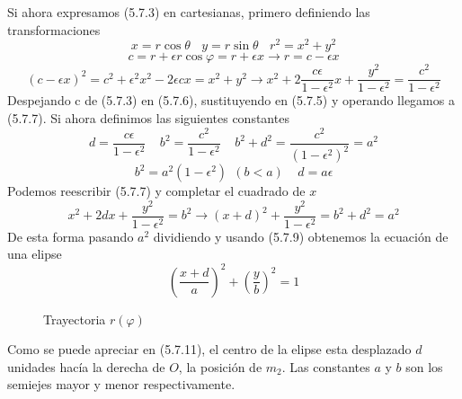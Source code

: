 Si ahora expresamos (5.7.3) en cartesianas, primero definiendo las transformaciones
\begin{equation} \label{5.1.5}
    x = r\cos\theta \ \ \ \ y = r\sin \theta \ \ \ \ r^2=x^2+y^2
\end{equation} 
\vspace{-15pt}
\begin{equation} \label{5.1.6}
    c = r +\epsilon r \cos\varphi = r+\epsilon x \rightarrow r = c-\epsilon x
\end{equation} 
\vspace{-20pt}
\begin{equation} \label{5.1.7}
    (c-\epsilon x)^2 = c^2 + \epsilon^2 x^2 -2\epsilon c x = x^2 + y^2 \rightarrow x^2 +2 \frac{c\epsilon}{1-\epsilon^2}x +\frac{y^2}{1-\epsilon^2}=\frac{c^2}{1-\epsilon^2}
\end{equation} 
Despejando c de (5.7.3) en (5.7.6), sustituyendo en (5.7.5) y operando llegamos a (5.7.7). Si ahora definimos las siguientes constantes
\begin{equation} \label{5.1.8}
    d = \frac{c\epsilon}{1-\epsilon^2} \ \ \ \ \ b^2 = \frac{c^2}{1-\epsilon^2} \ \ \ \ \ b^2 + d^2 = \frac{c^2}{(1-\epsilon^2)^2} = a^2
\end{equation} 
\vspace{-15pt}
\begin{equation} \label{5.1.8}
    b^2 = a^2(1-\epsilon^2) \ \ (b<a) \ \ \ \ \ d=a\epsilon
\end{equation} 
Podemos reescribir (5.7.7) y completar el cuadrado de $x$
\begin{equation} \label{5.1.7}
    x^2 +2dx +\frac{y^2}{1-\epsilon^2}=b^2 \rightarrow (x+d)^2 +\frac{y^2}{1-\epsilon^2}=b^2 + d^2 = a^2
\end{equation} 
De esta forma pasando $a^2$ dividiendo y usando (5.7.9) obtenemos la ecuación de una elipse
\begin{equation} \label{5.1.7}
    \left(\frac{x+d}{a}\right)^2 +\left(\frac{y}{b}\right)^2=1
\end{equation} 
\begin{figure}[H]
    \def\svgwidth{15 cm}
    \normalsize
	
    \vspace{-75pt}
    \caption{Trayectoria $r(\varphi)$}
\end{figure}
\vspace{15pt}
Como se puede apreciar en (5.7.11), el centro de la elipse esta desplazado $d$ unidades hacía la derecha de $O$, la posición de $m_2$. Las constantes $a$ y $b$ son los semiejes mayor y menor respectivamente.

